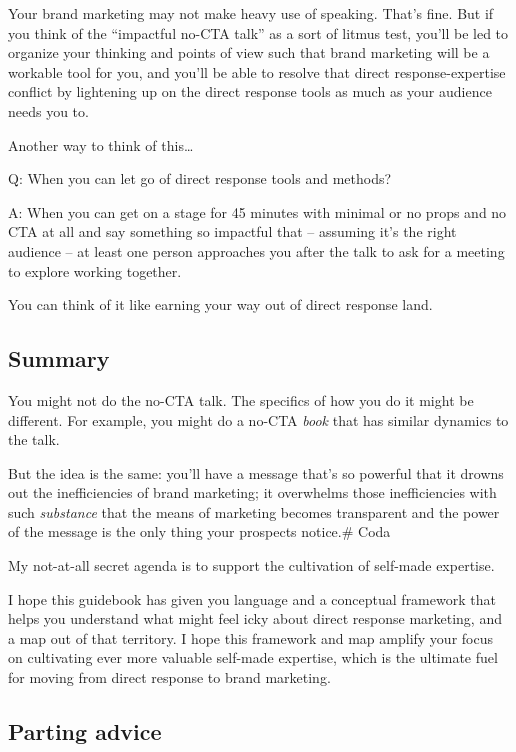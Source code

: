 \documentclass[13pt,]{tufte-handout}
\begin{document}
Your brand marketing may not make heavy use of speaking. That's fine.
But if you think of the ``impactful no-CTA talk'' as a sort of litmus
test, you'll be led to organize your thinking and points of view such
that brand marketing will be a workable tool for you, and you'll be able
to resolve that direct response-expertise conflict by lightening up on
the direct response tools as much as your audience needs you to.

Another way to think of this\ldots{}

Q: When you can let go of direct response tools and methods?

A: When you can get on a stage for 45 minutes with minimal or no props
and no CTA at all and say something so impactful that -- assuming it's
the right audience -- at least one person approaches you after the talk
to ask for a meeting to explore working together.

You can think of it like earning your way out of direct response land.

\hypertarget{summary-4}{%
\subsection{Summary}\label{summary-4}}

You might not do the no-CTA talk. The specifics of how you do it might
be different. For example, you might do a no-CTA \emph{book} that has
similar dynamics to the talk.

But the idea is the same: you'll have a message that's so powerful that
it drowns out the inefficiencies of brand marketing; it overwhelms those
inefficiencies with such \emph{substance} that the means of marketing
becomes transparent and the power of the message is the only thing your
prospects notice.\# Coda

My not-at-all secret agenda is to support the cultivation of self-made
expertise.

I hope this guidebook has given you language and a conceptual framework
that helps you understand what might feel icky about direct response
marketing, and a map out of that territory. I hope this framework and
map amplify your focus on cultivating ever more valuable self-made
expertise, which is the ultimate fuel for moving from direct response to
brand marketing.

\hypertarget{parting-advice}{%
\subsection{Parting advice}\label{parting-advice}}
\end{document}
